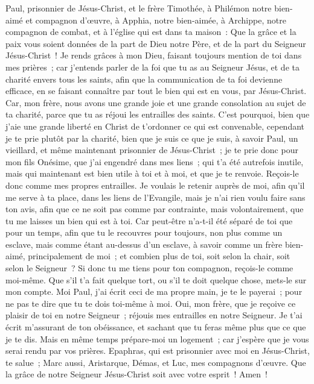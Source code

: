 \begin{multicols}{2}
\VerseOne{}Paul, prisonnier de Jésus-Christ, et le frère Timothée, à Philémon notre bien-aimé et compagnon d'œuvre,
à Apphia, notre bien-aimée, à Archippe, notre compagnon de combat, et à l'église qui est dans ta maison~:
Que la grâce et la paix vous soient données de la part de Dieu notre Père, et de la part du Seigneur Jésus-Christ~!
Je rends grâces à mon Dieu, faisant toujours mention de toi dans mes prières~;
car j'entends parler de la foi que tu as au Seigneur Jésus, et de ta charité envers tous les saints,
afin que la communication de ta foi devienne efficace, en se faisant connaître par tout le bien qui est en vous, par Jésus-Christ.
Car, mon frère, nous avons une grande joie et une grande consolation au sujet de ta charité, parce que tu as réjoui les entrailles des saints.
C'est pourquoi, bien que j'aie une grande liberté en Christ de t'ordonner ce qui est convenable,
cependant je te prie plutôt par la charité, bien que je suis ce que je suis, à savoir Paul, un vieillard, et même maintenant prisonnier de Jésus-Christ~;
je te prie donc pour mon fils Onésime, que j'ai engendré dans mes liens~;
qui t'a été autrefois inutile, mais qui maintenant est bien utile à toi et à moi, et que je te renvoie.
Reçois-le donc comme mes propres entrailles.
Je voulais le retenir auprès de moi, afin qu'il me serve à ta place, dans les liens de l'Evangile,
mais je n'ai rien voulu faire sans ton avis, afin que ce ne soit pas comme par contrainte, mais volontairement, que tu me laisses un bien qui est à toi.
Car peut-être n'a-t-il été séparé de toi que pour un temps, afin que tu le recouvres pour toujours,
non plus comme un esclave, mais comme étant au-dessus d'un esclave, à savoir comme un frère bien-aimé, principalement de moi~; et combien plus de toi, soit selon la chair, soit selon le Seigneur~?
Si donc tu me tiens pour ton compagnon, reçois-le comme moi-même.
Que s'il t'a fait quelque tort, ou s'il te doit quelque chose, mets-le sur mon compte.
Moi Paul, j'ai écrit ceci de ma propre main, je te le payerai~; pour ne pas te dire que tu te dois toi-même à moi.
Oui, mon frère, que je reçoive ce plaisir de toi en notre Seigneur~; réjouis mes entrailles en notre Seigneur.
Je t'ai écrit m'assurant de ton obéissance, et sachant que tu feras même plus que ce que je te dis.
Mais en même temps prépare-moi un logement~; car j'espère que je vous serai rendu par vos prières.
Epaphras, qui est prisonnier avec moi en Jésus-Christ, te salue~;
Marc aussi, Aristarque, Démas, et Luc, mes compagnons d'œuvre.
Que la grâce de notre Seigneur Jésus-Christ soit avec votre esprit~! Amen~!
\PPE{}
\end{multicols}
